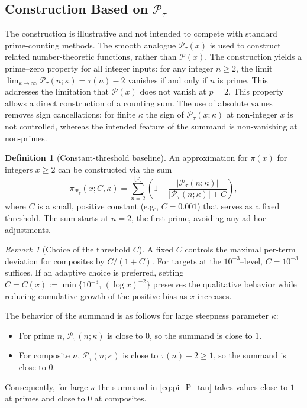 \documentclass[11pt,a4paper]{amsart}
\theoremstyle{plain}
\theoremstyle{definition}
\newtheorem{definition}[theorem]{Definition}
\theoremstyle{remark}
\newtheorem{remark}[theorem]{Remark}
\begin{document}
\subsection{Construction Based on $\mathcal{P}_{\tau}$}
The construction is illustrative and not intended to compete with standard prime-counting methods.
The smooth analogue $\mathcal{P}_{\tau}(x)$ is used to construct related number-theoretic functions, rather than $\mathcal{P}(x)$.
The construction yields a prime–zero property for all integer inputs: for any integer $n \ge 2$, the limit $\lim_{\kappa\to\infty} \mathcal{P}_{\tau}(n;\kappa)=\tau(n)-2$ vanishes if and only if $n$ is prime.
This addresses the limitation that $\mathcal{P}(x)$ does not vanish at $p=2$.
This property allows a direct construction of a counting sum. The use of absolute values removes sign cancellations: for finite $\kappa$ the sign of $\mathcal{P}_{\tau}(x;\kappa)$ at non-integer $x$ is not controlled, whereas the intended feature of the summand is non-vanishing at non-primes.

\begin{definition}[Constant-threshold baseline]
An approximation for $\pi(x)$ for integers $x\ge2$ can be constructed via the sum
\begin{equation}\label{eq:pi_P_tau}
\pi_{\mathcal{P}_\tau}(x; C, \kappa) = \sum_{n=2}^{\lfloor x \rfloor} \left(1 - \frac{|\mathcal{P}_{\tau}(n; \kappa)|}{|\mathcal{P}_{\tau}(n; \kappa)| + C}\right),
\end{equation}
where $C$ is a small, positive constant (e.g., $C=0.001$) that serves as a fixed threshold.
The sum starts at $n=2$, the first prime, avoiding any ad-hoc adjustments.
\end{definition}

\begin{remark}[Choice of the threshold $C$]
A fixed $C$ controls the maximal per-term deviation for composites by $C/(1+C)$. For targets at the $10^{-3}$–level, $C=10^{-3}$ suffices. If an adaptive choice is preferred, setting $C=C(x):=\min\{10^{-3},\,(\log x)^{-2}\}$ preserves the qualitative behavior while reducing cumulative growth of the positive bias as $x$ increases.
\end{remark}

The behavior of the summand is as follows for large steepness parameter $\kappa$:
\begin{itemize}
    \item For prime $n$, $\mathcal{P}_{\tau}(n; \kappa)$ is close to $0$, so the summand is close to $1$.
    \item For composite $n$, $\mathcal{P}_{\tau}(n; \kappa)$ is close to $\tau(n)-2 \ge 1$, so the summand is close to $0$.
\end{itemize}
Consequently, for large $\kappa$ the summand in \eqref{eq:pi_P_tau} takes values close to $1$ at primes and close to $0$ at composites.
\end{document}
